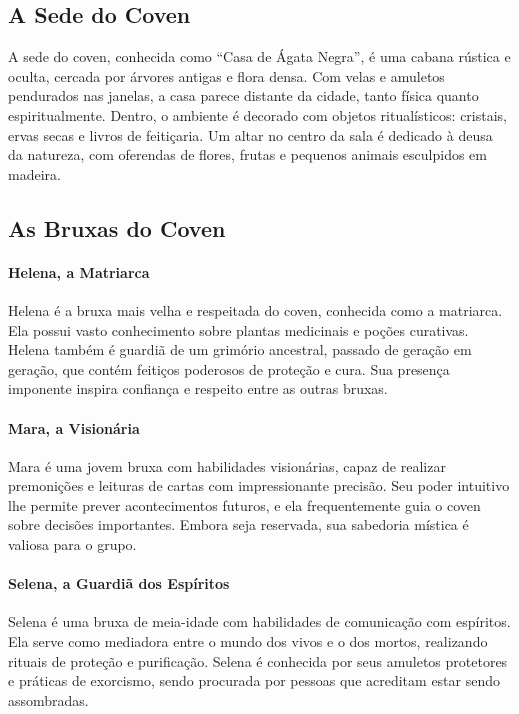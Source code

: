 \subsection{A Sede do Coven}

A sede do coven, conhecida como ``Casa de Ágata Negra'', é uma cabana rústica e oculta, cercada por árvores antigas e flora densa. Com velas e amuletos pendurados nas janelas, a casa parece distante da cidade, tanto física quanto espiritualmente. Dentro, o ambiente é decorado com objetos ritualísticos: cristais, ervas secas e livros de feitiçaria. Um altar no centro da sala é dedicado à deusa da natureza, com oferendas de flores, frutas e pequenos animais esculpidos em madeira.

\subsection{As Bruxas do Coven}

\paragraph{Helena, a Matriarca}  
Helena é a bruxa mais velha e respeitada do coven, conhecida como a matriarca. Ela possui vasto conhecimento sobre plantas medicinais e poções curativas. Helena também é guardiã de um grimório ancestral, passado de geração em geração, que contém feitiços poderosos de proteção e cura. Sua presença imponente inspira confiança e respeito entre as outras bruxas.

\paragraph{Mara, a Visionária}  
Mara é uma jovem bruxa com habilidades visionárias, capaz de realizar premonições e leituras de cartas com impressionante precisão. Seu poder intuitivo lhe permite prever acontecimentos futuros, e ela frequentemente guia o coven sobre decisões importantes. Embora seja reservada, sua sabedoria mística é valiosa para o grupo.

\paragraph{Selena, a Guardiã dos Espíritos}  
Selena é uma bruxa de meia-idade com habilidades de comunicação com espíritos. Ela serve como mediadora entre o mundo dos vivos e o dos mortos, realizando rituais de proteção e purificação. Selena é conhecida por seus amuletos protetores e práticas de exorcismo, sendo procurada por pessoas que acreditam estar sendo assombradas.

